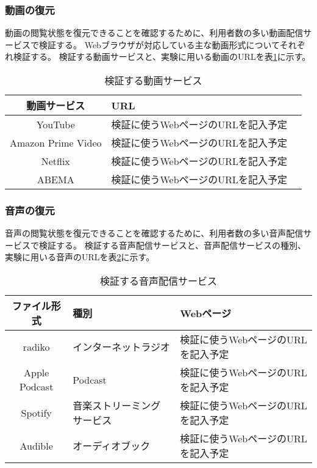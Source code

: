 \subsubsection{動画の復元}
動画の閲覧状態を復元できることを確認するために、利用者数の多い動画配信サービスで検証する。
Webブラウザが対応している主な動画形式についてそれぞれ検証する。
検証する動画サービスと、実験に用いる動画のURLを表\ref{tb:evl-video-check-list}に示す。

\begin{table}[htbp]
  \begin{center}
    \caption{検証する動画サービス}
    \label{tb:evl-video-check-list}
    \begin{tabular}{|c|l|l|}
      \hline
      動画サービス & URL \\\hline\hline
      YouTube & 検証に使うWebページのURLを記入予定 \\\hline
      Amazon Prime Video & 検証に使うWebページのURLを記入予定 \\\hline
      Netflix & 検証に使うWebページのURLを記入予定 \\\hline
      ABEMA & 検証に使うWebページのURLを記入予定 \\\hline
    \end{tabular}
  \end{center}
\end{table}

\subsubsection{音声の復元}
音声の閲覧状態を復元できることを確認するために、利用者数の多い音声配信サービスで検証する。
検証する音声配信サービスと、音声配信サービスの種別、実験に用いる音声のURLを表\ref{tb:evl-audio-check-list}に示す。

\begin{table}[htbp]
  \begin{center}
    \caption{検証する音声配信サービス}
    \label{tb:evl-audio-check-list}
    \begin{tabular}{|c|l|l|}
      \hline
      ファイル形式 & 種別 & Webページ \\\hline\hline
      radiko & インターネットラジオ & 検証に使うWebページのURLを記入予定 \\\hline
      Apple Podcast & Podcast & 検証に使うWebページのURLを記入予定 \\\hline
      Spotify & 音楽ストリーミングサービス & 検証に使うWebページのURLを記入予定 \\\hline
      Audible & オーディオブック & 検証に使うWebページのURLを記入予定 \\\hline
    \end{tabular}
  \end{center}
\end{table}

